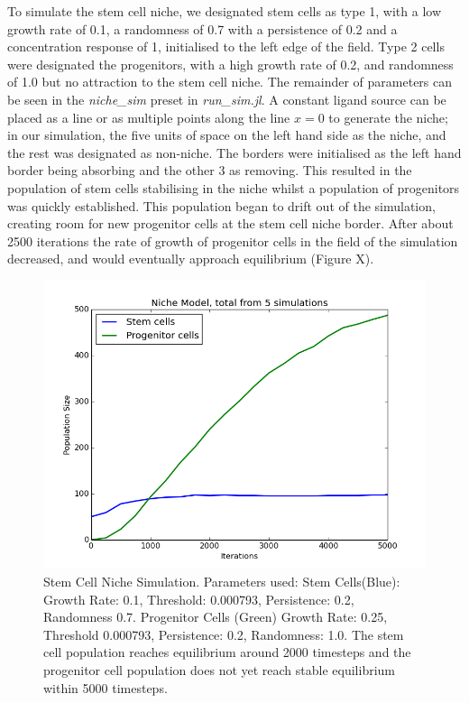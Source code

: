 \documentclass[12pt]{article}
\begin{document}
To simulate the stem cell niche, we designated stem cells as type 1, 
with a low growth rate of 0.1, a randomness of 0.7 with a persistence of 
0.2 and a concentration response of 1, initialised to the left edge of 
the field. Type 2 cells were designated the progenitors, with a high 
growth rate of 0.2, and randomness of 1.0 but no attraction to the stem 
cell niche. The remainder of parameters can be seen in the {\itshape 
niche\_sim} preset in {\itshape run\_sim.jl}. A constant ligand source can be 
placed as a line or as multiple points along the line \(x=0\) to generate the 
niche; in our simulation, the five units of space on the left hand side 
as the niche, and the rest was designated as non-niche. The borders were 
initialised as the left hand border being absorbing and the other 3 as 
removing. This resulted in the population of stem cells stabilising in 
the niche whilst a population of progenitors was quickly established. 
This population began to drift out of the simulation, creating room for 
new progenitor cells at the stem cell niche border. After about 2500 
iterations the rate of growth of progenitor cells in the field of the 
simulation decreased, and would eventually approach equilibrium (Figure 
X).

\begin{figure}[H]
\centering
\includegraphics[width=13.51cm]{media/pops.png}
\caption{Stem Cell Niche Simulation. Parameters used: Stem Cells(Blue): Growth Rate: 0.1, Threshold: 0.000793, 
  Persistence: 0.2, Randomness 0.7. Progenitor Cells (Green) Growth Rate: 0.25, Threshold 0.000793, Persistence: 
  0.2, Randomness: 1.0. The stem cell population reaches equilibrium around 2000 timesteps and the progenitor 
cell population does not yet reach stable equilibrium within 5000 timesteps.}
\end{figure}
\end{document}
